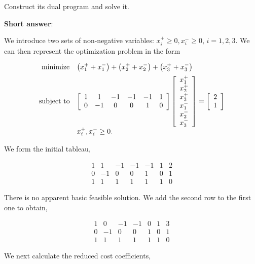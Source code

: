 Construct its dual program and solve it.

\textbf{Short answer}:

We introduce two sets of non-negative variables: \(x_{i}^{+} \geq 0, x_{i}^{-} \geq 0\), \(i=1,2,3\). We can then represent the optimization problem in the form

\[
	\begin{array}{cl}
		\text { minimize} &
		\left(x_{1}^{+}+x_{1}^{-}\right)+\left(x_{2}^{+}+x_{2}^{-}\right)+\left(x_{3}^{+}+x_{3}^{-}\right) \vspace{2mm} \\
		\text {subject to} & {\left[\begin{array}{cccccc}
				1 & 1 & -1 & -1 & -1 & 1 \\
				0 & -1 & 0 & 0 & 1 & 0
			\end{array}\right]\left[\begin{array}{l}
				x_{1}^{+} \\
				x_{2}^{+} \\
				x_{3}^{+} \\
				x_{1}^{-} \\
				x_{2}^{-} \\
				x_{3}^{-}
			\end{array}\right]=\left[\begin{array}{l}
				2 \\
				1
			\end{array}\right]} \\
		& x_{i}^{+}, x_{i}^{-} \geq 0 .
	\end{array}
\]

We form the initial tableau,

\[
	\begin{array}{cccccc|c}
		1 & 1 & -1 & -1 & -1 & 1 & 2 \\
		0 & -1 & 0 & 0 & 1 & 0 & 1 \\
		\hline 1 & 1 & 1 & 1 & 1 & 1 & 0
	\end{array}
\]

There is no apparent basic feasible solution. We add the second row to the first one to obtain,

\[
	\begin{array}{cccccc|c}
		1 & 0 & -1 & -1 & 0 & 1 & 3 \\
		0 & -1 & 0 & 0 & 1 & 0 & 1 \\
		\hline 1 & 1 & 1 & 1 & 1 & 1 & 0
	\end{array}
\]

We next calculate the reduced cost coefficients,

